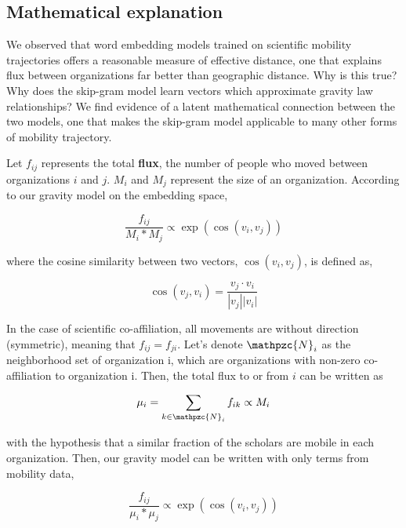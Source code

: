\documentclass[12pt]{article} %
\begin{document}
%
%
\subsection*{Mathematical explanation}

We observed that word embedding models trained on scientific mobility trajectories offers a reasonable measure of effective distance, one that explains flux between organizations far better than geographic distance. 
Why is this true?
Why does the skip-gram model learn vectors which approximate gravity law relationships?
We find evidence of a latent mathematical connection between the two models, one that makes the skip-gram model applicable to many other forms of mobility trajectory. 

Let $f_{ij}$ represents the total \textbf{flux}, the number of people who moved between organizations $i$ and $j$. $M_{i}$ and $M_{j}$ represent the size of an organization. According to our gravity model on the embedding space,

\begin{equation}
    \label{eq:gravity_model}
    \frac{f_{ij}}{M_{i} * M_{j}} \propto \exp(\cos(v_i,v_j))
\end{equation}

where the cosine similarity between two vectors, $\cos(v_{i}, v_{j})$, is defined as,

\begin{equation}
    \cos(v_j, v_i) = \frac{v_j \cdot v_i}{|v_j||v_i|} 
\end{equation}

In the case of scientific co-affiliation, all movements are without direction (symmetric), meaning that  $f_{ij} = f_{ji}$.
Let's denote $\mathpzc{N}_i$ as the neighborhood set of organization i, which are organizations with non-zero co-affiliation to organization i.
Then, the total flux to or from $i$ can be written as 

\begin{equation}
    \mu_{i} = \sum_{k\in\mathpzc{N}_i} f_{ik} \propto M_i
\end{equation} 

with the hypothesis that a similar fraction of the scholars are mobile in each organization. Then, our gravity model can be written with only terms from mobility data, 

\begin{equation}
    \label{eq:gravity_model_approx}
    \frac{f_{ij}}{\mu_i * \mu_j} \propto \exp(\cos(v_i,v_j))
\end{equation}
\end{document}
